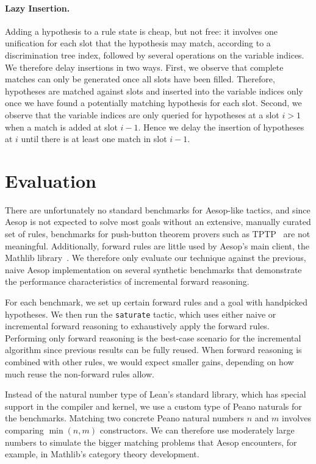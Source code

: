 \documentclass[runningheads,leqno]{llncs}
\newcommand{\para}[1]{\paragraph{\bfseries\upshape #1}}
\begin{document}
\para{Lazy Insertion.}
Adding a hypothesis to a rule state is cheap, but not free: it involves one unification for each slot that the hypothesis may match, according to a discrimination tree index, followed by several operations on the variable indices.
We therefore delay insertions in two ways.
First, we observe that complete matches can only be generated once all slots have been filled.
Therefore, hypotheses are matched against slots and inserted into the variable indices only once we have found a potentially matching hypothesis for each slot.
Second, we observe that the variable indices are only queried for hypotheses at a slot $i > 1$ when a match is added at slot $i - 1$.
Hence we delay the insertion of hypotheses at $i$ until there is at least one match in slot $i - 1$.

\section{Evaluation}%
\label{sec:evaluation}

There are unfortunately no standard benchmarks for Aesop-like tactics, and since Aesop is not expected to solve most goals without an extensive, manually curated set of rules, benchmarks for push-button theorem provers such as TPTP~\cite{TPTP} are not meaningful.
Additionally, forward rules are little used by Aesop's main client, the Mathlib library~\cite{Mathlib}.
We therefore only evaluate our technique against the previous, naive Aesop implementation on several synthetic benchmarks that demonstrate the performance characteristics of incremental forward reasoning.

For each benchmark, we set up certain forward rules and a goal with handpicked hypotheses.
We then run the \texttt{saturate} tactic, which uses either naive or incremental forward reasoning to exhaustively apply the forward rules.
Performing only forward reasoning is the best-case scenario for the incremental algorithm since previous results can be fully reused.
When forward reasoning is combined with other rules, we would expect smaller gains, depending on how much reuse the non-forward rules allow.

Instead of the natural number type of Lean's standard library, which has special support in the compiler and kernel, we use a custom type of Peano naturals for the benchmarks.
Matching two concrete Peano natural numbers $n$ and $m$ involves comparing $\min(n, m)$ constructors.
We can therefore use moderately large numbers to simulate the bigger matching problems that Aesop encounters, for example, in Mathlib's category theory development.
\end{document}
